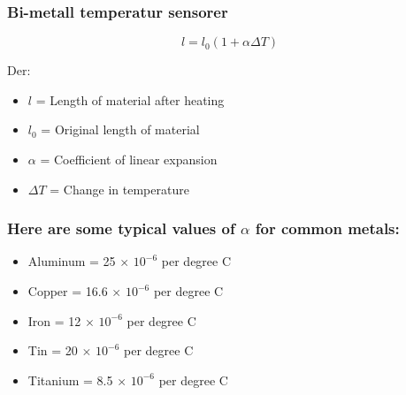 \documentclass[aspectratio=169,xcolor=dvipsnames]{beamer}
\begin{document}
\begin{frame}
	\frametitle{Bi-metall temperatur sensorer}

$$l = l_0 (1 + \alpha \Delta T)$$

Der:
	\begin{itemize}
		\item $l$ = Length of material after heating

		\item $l_0$ = Original length of material

		\item $\alpha$ = Coefficient of linear expansion 

		\item $\Delta T$ = Change in temperature
	\end{itemize}

	

\vskip 10pt
\end{frame}
%
%
\begin{frame}
	\frametitle{Here are some typical values of $\alpha$ for common metals:}
\begin{itemize}
\item Aluminum = 25 $\times$ $10^{-6}$ per degree C
\item Copper = 16.6 $\times$ $10^{-6}$ per degree C
\item Iron = 12 $\times$ $10^{-6}$ per degree C
\item Tin = 20 $\times$ $10^{-6}$ per degree C
\item Titanium = 8.5 $\times$ $10^{-6}$ per degree C
\end{itemize}

\end{frame}
\end{document}

